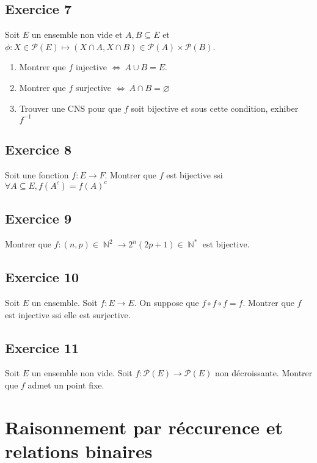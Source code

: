 \documentclass{article}
\DeclareMathOperator{\N}{\mathbb{N}}
\begin{document}
\subsection*{Exercice 7} 

Soit $E$ un ensemble non vide et $A, B \subseteq E$ et $\phi : X \in \mathcal{P}(E) \mapsto (X\cap A, X\cap B) \in \mathcal{P}(A) \times \mathcal{P}(B)$.

\begin{enumerate}
    \item Montrer que $f$ injective $\Leftrightarrow \ A\cup B = E$.
    \item Montrer que $f$ surjective $\Leftrightarrow \ A \cap B = \varnothing$
    \item Trouver une CNS pour que $f$ soit bijective et sous cette condition, exhiber $f^{-1}$
\end{enumerate}

\subsection*{Exercice 8} 

Soit une fonction $f:E\to F$. Montrer que $f$ est bijective ssi $\forall A \subseteq E, f(A^c) = f(A)^c$ 

\subsection*{Exercice 9} 

Montrer que $f: (n,p)\in \N^2 \to 2^n(2p+1)\in \N^* $ est bijective. 

\subsection*{Exercice 10} 

Soit $E$ un ensemble. Soit $f : E \to E$. On suppose que $f\circ f\circ f = f$. Montrer que $f$ est injective ssi elle est surjective. 

\subsection*{Exercice 11} 

Soit $E$ un ensemble non vide. Soit $f : \mathcal{P}(E) \to \mathcal{P}(E)$ non décroissante. Montrer que $f$ admet un point fixe. 

\clearpage

\section{Raisonnement par réccurence et relations binaires}
\end{document}
